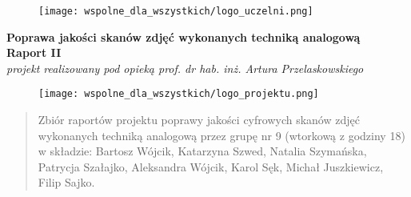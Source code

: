 \documentclass[]{mwart}
\begin{document}
\thispagestyle{empty}

\begin{figure}[h]
    \centering
    \texttt{[image: wspolne\_dla\_wszystkich/logo\_uczelni.png]}
\end{figure}


\begin{center}
    {\LARGE \textbf{Poprawa jakości skanów zdjęć wykonanych techniką analogową
        }} \\[0.3cm]
    {\large \textbf{Raport II}} \\[0.2cm]
    \textit{projekt realizowany pod opieką prof. dr hab. inż. Artura Przelaskowskiego}

\end{center}

\begin{figure}[h]
    \centering
    \texttt{[image: wspolne\_dla\_wszystkich/logo\_projektu.png]}
\end{figure}

\vfill
\begin{abstract}
    Zbiór raportów projektu poprawy jakości cyfrowych skanów zdjęć wykonanych techniką
    analogową przez grupę nr 9 (wtorkową z godziny 18)
    w składzie:  Bartosz Wójcik, Katarzyna Szwed, Natalia Szymańska,
    Patrycja Szałajko, Aleksandra Wójcik, Karol Sęk, Michał Juszkiewicz, Filip Sajko.
\end{abstract}


\newpage
\tableofcontents
\newpage
\end{document}
